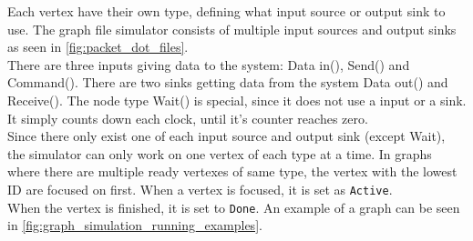 Each vertex have their own type, defining what input source or output sink to
use. The graph file simulator consists of multiple input sources and output sinks
as seen in \autoref{fig:packet_dot_files}.\\
There are three inputs giving data to the system:
Data in(),
Send() and
Command().
There are two sinks getting data from the system
Data out() and
Receive().
The node type Wait() is special, since
it does not use a input or a sink. It simply counts down each clock, until it's
counter reaches zero.\\
Since there only exist one of each input source and output sink (except Wait),
the simulator can only work on one vertex of each type at a time.
In graphs where there are multiple ready vertexes of same type, the vertex with
the lowest ID are focused on first. When a vertex is focused, it is set as
\texttt{Active}.\\
When the vertex is finished, it is set to \texttt{Done}.
An example of a graph can be seen in
\autoref{fig:graph_simulation_running_examples}.


